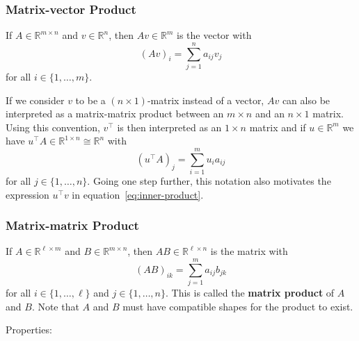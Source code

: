 \documentclass[
  a4paper,
]{article}
\theoremstyle{definition}
\theoremstyle{definition}
\theoremstyle{definition}
\theoremstyle{definition}
\theoremstyle{remark}
\begin{document}
\hypertarget{matrix-vector-product}{%
\subsubsection{Matrix-vector Product}\label{matrix-vector-product}}

If \(A \in \mathbb{R}^{m \times n}\) and \(v \in \mathbb{R}^n\), then
\(Av \in \mathbb{R}^m\) is the vector with
\begin{equation*}
  (Av)_i
  = \sum_{j=1}^n a_{ij} v_j
\end{equation*}
for all \(i \in \{1, \ldots, m\}\).

If we consider \(v\) to be a \((n\times 1)\)-matrix instead of a vector,
\(Av\) can also be interpreted as a matrix-matrix product between an \(m \times n\) and an \(n\times 1\) matrix. Using this convention, \(v^\top\)
is then interpreted as an \(1 \times n\) matrix and if \(u\in\mathbb{R}^m\) we
have \(u^\top A \in \mathbb{R}^{1 \times n} \cong \mathbb{R}^n\) with
\begin{equation*}
  (u^\top A)_j
  = \sum_{i=1}^m u_i a_{ij}
\end{equation*}
for all \(j \in \{1, \ldots, n\}\). Going one step further, this
notation also motivates the expression \(u^\top v\) in
equation~\eqref{eq:inner-product}.

\hypertarget{matrix-matrix-product}{%
\subsubsection{Matrix-matrix Product}\label{matrix-matrix-product}}

If \(A \in \mathbb{R}^{\ell \times m}\) and \(B \in \mathbb{R}^{m\times n}\), then
\(AB \in \mathbb{R}^{\ell \times n}\) is the matrix with
\begin{equation*}
  (AB)_{ik}
  = \sum_{j=1}^m a_{ij} b_{jk}
\end{equation*}
for all \(i \in \{1, \ldots, \ell\}\) and \(j \in \{1, \ldots, n\}\).
This is called the \textbf{matrix product} of \(A\) and \(B\). Note
that \(A\) and \(B\) must have compatible shapes for the product to exist.

Properties:
\end{document}
